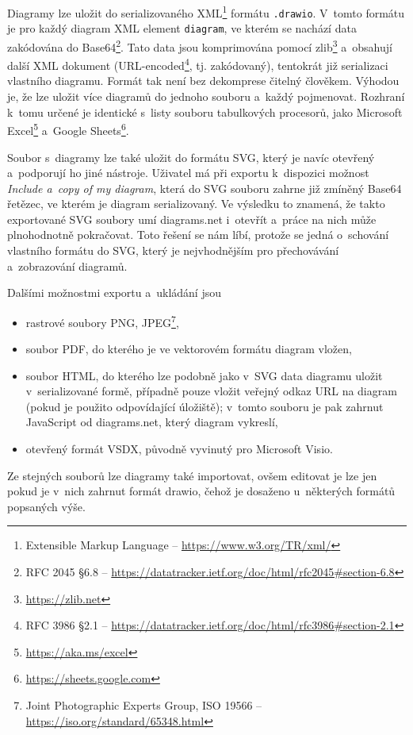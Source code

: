 Diagramy lze uložit do serializovaného XML\footnote{Extensible Markup Language -- \url{https://www.w3.org/TR/xml/}} formátu \texttt{.drawio}.
V~tomto formátu je pro každý diagram XML element \texttt{diagram}, ve kterém se nachází data zakódována do Base64\footnote{RFC 2045 \S6.8 -- \url{https://datatracker.ietf.org/doc/html/rfc2045\#section-6.8}}.
Tato data jsou komprimována pomocí zlib\footnote{\url{https://zlib.net}} a~obsahují další XML dokument (URL-encoded\footnote{RFC 3986 \S2.1 -- \url{https://datatracker.ietf.org/doc/html/rfc3986\#section-2.1}}, tj. zakódovaný), tentokrát již serializaci vlastního diagramu.
Formát tak není bez dekomprese čitelný člověkem.
Výhodou je, že lze uložit více diagramů do jednoho souboru a~každý pojmenovat.
Rozhraní k~tomu určené je identické s~listy souboru tabulkových procesorů, jako Microsoft Excel\footnote{\url{https://aka.ms/excel}} a~Google Sheets\footnote{\url{https://sheets.google.com}}.

Soubor s~diagramy lze také uložit do formátu SVG, který je navíc otevřený a~podporují ho jiné nástroje.
Uživatel má při exportu k~dispozici možnost \textit{Include a~copy of my diagram}, která do SVG souboru zahrne již zmíněný Base64 řetězec, ve kterém je diagram serializovaný.
Ve výsledku to znamená, že takto exportované SVG soubory umí diagrams.net i~otevřít a~práce na nich může plnohodnotně pokračovat.
Toto řešení se nám líbí, protože se jedná o~schování vlastního formátu do SVG, který je nejvhodnějším pro přechovávání a~zobrazování diagramů.

Dalšími možnostmi exportu a~ukládání jsou
\begin{itemize}
  \item rastrové soubory PNG, JPEG\footnote{Joint Photographic Experts Group, ISO 19566 -- \url{https://iso.org/standard/65348.html}},
  \item soubor PDF, do kterého je ve vektorovém formátu diagram vložen,
  \item soubor HTML, do kterého lze podobně jako v~SVG data diagramu uložit v~serializované formě, případně pouze vložit veřejný odkaz URL na diagram (pokud je použito odpovídající úložiště);
  v~tomto souboru je pak zahrnut JavaScript od diagrams.net, který diagram vykreslí,
  \item otevřený formát VSDX, původně vyvinutý pro Microsoft Visio.
\end{itemize}

Ze stejných souborů lze diagramy také importovat, ovšem editovat je lze jen pokud je v~nich zahrnut formát drawio, čehož je dosaženo u~některých formátů popsaných výše.

